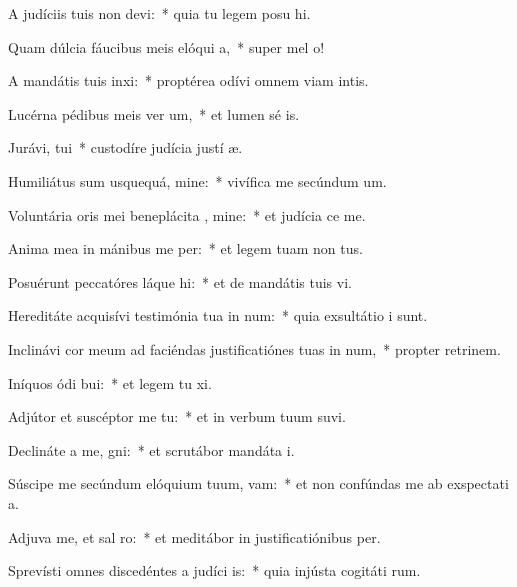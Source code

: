 \item A judíciis tuis non devi:~* quia tu legem posu hi.
\item Quam dúlcia fáucibus meis elóqui a,~* super mel  o!
\item A mandátis tuis inxi:~* proptérea odívi omnem viam intis.
\item Lucérna pédibus meis ver um,~* et lumen sé is.
\item Jurávi,  tui~* custodíre judícia justí æ.
\item Humiliátus sum usquequá, mine:~* vivífica me secúndum  um.
\item Voluntária oris mei beneplácita , mine:~* et judícia  ce me.
\item Anima mea in mánibus me per:~* et legem tuam non  tus.
\item Posuérunt peccatóres láque hi:~* et de mandátis tuis  vi.
\item Hereditáte acquisívi testimónia tua in num:~* quia exsultátio  i sunt.
\item Inclinávi cor meum ad faciéndas justificatiónes tuas in num,~* propter retrinem.
\item Iníquos ódi bui:~* et legem tu xi.
\item Adjútor et suscéptor me  tu:~* et in verbum tuum suvi.
\item Declináte a me, gni:~* et scrutábor mandáta  i.
\item Súscipe me secúndum elóquium tuum,  vam:~* et non confúndas me ab exspectati a.
\item Adjuva me, et sal ro:~* et meditábor in justificatiónibus  per.
\item Sprevísti omnes discedéntes a judíci is:~* quia injústa cogitáti rum.
